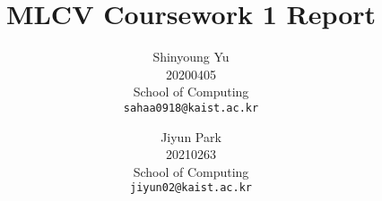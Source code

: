 \documentclass[10pt,twocolumn,letterpaper]{article}
\begin{document}
\title{MLCV Coursework 1 Report}

\author{Shinyoung Yu\\
20200405\\
School of Computing\\
{\tt\small sahaa0918@kaist.ac.kr}
\and
Jiyun Park\\
20210263\\
School of Computing\\
{\tt\small jiyun02@kaist.ac.kr}
}

\maketitle

%    






\newpage
\appendix
\onecolumn  %


{
    \small
    
    
}

% 
\end{document}
